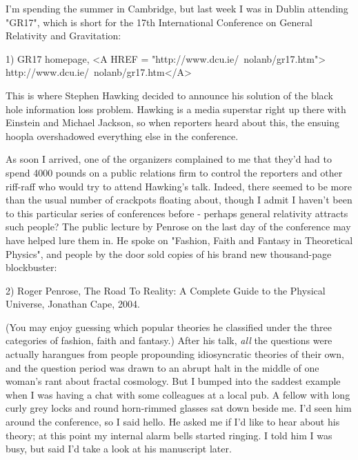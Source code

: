 

I'm spending the summer in Cambridge, but last week I was in Dublin 
attending "GR17", which is short for the 17th International Conference 
on General Relativity and Gravitation:

1) GR17 homepage, <A HREF = "http://www.dcu.ie/~nolanb/gr17.htm">
http://www.dcu.ie/~nolanb/gr17.htm</A>

This is where Stephen Hawking decided to announce his solution of
the black hole information loss problem.  Hawking is a media superstar 
right up there with Einstein and Michael Jackson, so when reporters 
heard about this, the ensuing hoopla overshadowed everything else in 
the conference.  

As soon I arrived, one of the organizers complained to me that they'd
had to spend 4000 pounds on a public relations firm to control the 
reporters and other riff-raff who would try to attend Hawking's talk.
Indeed, there seemed to be more than the usual number of crackpots 
floating about, though I admit I haven't been to this particular series 
of conferences before - perhaps general relativity attracts such people?  
The public lecture by Penrose on the last day of the conference may have 
helped lure them in.   He spoke on "Fashion, Faith and Fantasy in 
Theoretical Physics", and people by the door sold copies of his brand 
new thousand-page blockbuster:

2) Roger Penrose, The Road To Reality: A Complete Guide to the 
Physical Universe, Jonathan Cape, 2004.

(You may enjoy guessing which popular theories he classified under
the three categories of fashion, faith and fantasy.)  After his talk, 
\emph{all} the questions were actually harangues from people propounding 
idiosyncratic theories of their own, and the question period was drawn 
to an abrupt halt in the middle of one woman's rant about fractal 
cosmology.  But I bumped into the saddest example when I was having a 
chat with some colleagues at a local pub.  A fellow with long curly grey 
locks and round horn-rimmed glasses sat down beside me.  I'd seen him 
around the conference, so I said hello.  He asked me if I'd like to hear 
about his theory; at this point my internal alarm bells started ringing.   
I told him I was busy, but said I'd take a look at his manuscript later.

